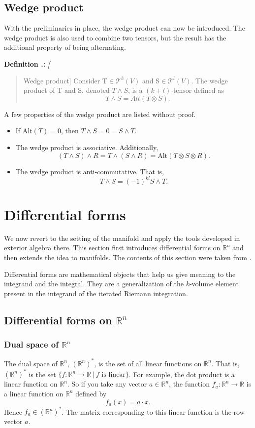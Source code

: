 \documentclass{article}
\theoremstyle{definition}
\newtheorem{definition}[theorem]{Definition}
\theoremstyle{named}
\newcounter{definition}[section]
\renewcommand{\thedefinition}{\thesection.\arabic{definition}}
\newenvironment{definition}[1] %
{%
    \refstepcounter{definition}%
    \noindent\textbf{Definition \thedefinition:} {\textit{#1}}\par\nobreak\noindent
    \begin{quote}
}%
{%
    \end{quote}
}
\begin{document}
\subsection{Wedge product}
With the preliminaries in place, the wedge product can now be introduced. The wedge product is also used to combine two tensors, but the result has the additional property of being alternating.

\begin{definition}[Wedge product]
    Consider T$\in \mathcal{T}^k (V)$ and S$\in \mathcal{T}^l (V)$. The wedge product of T and S, denoted $T \wedge S$, is a $(k+l)$-tensor defined as 
    \[
        T \wedge S = Alt(T \otimes S).
    \]    
\end{definition}
A few properties of the wedge product are listed without proof.
\begin{itemize}
    \item If Alt$(T) = 0$, then $T \wedge S = 0 = S \wedge T$.
    \item The wedge product is associative. Additionally, 
    $$(T \wedge S) \wedge R = T \wedge (S \wedge R) = \text{Alt}(T\otimes S\otimes R).$$
    \item The wedge product is anti-commutative. That is,
    $$T \wedge S = (-1)^{kl} S \wedge T.$$
\end{itemize}
 

\section{Differential forms}

We now revert to the setting of the manifold and apply the tools developed in exterior algebra there. This section first introduces differential forms on $\mathbb{R}^n$ and then extends the idea to manifolds. The contents of this section were taken from  \cite{shifrin2004multivariable, hubbard2009vector}. 

Differential forms are mathematical objects that help us give meaning to the integrand and the integral. They are a generalization of the  $k$-volume element present in the integrand of the iterated Riemann integration. 
\subsection{Differential forms on $\mathbb{R}^n$}
\subsubsection{Dual space of $\mathbb{R}^n$}
The dual space of $\mathbb{R}^n$, $(\mathbb{R}^n)^*$, is the set of all linear functions on $\mathbb{R}^n$. That is, $(\mathbb{R}^n)^*$ is the set $\{ f: \mathbb{R}^n \to \mathbb{R} \ | \ f \text{ is linear} \}$. For example, the dot product is a linear function on $\mathbb{R}^n$. So if you take any vector $a \in \mathbb{R}^n$, the function $f_a: \mathbb{R}^n \to \mathbb{R}$ is a linear function on $\mathbb{R}^n$ defined by
$$f_a(x) = a \cdot x.$$ 
Hence $f_a \in (\mathbb{R}^n)^*$. The matrix corresponding to this linear function is the row vector $a$.
\end{document}

